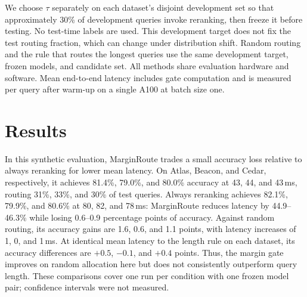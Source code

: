 \documentclass[11pt]{article}
\begin{document}
We choose $\tau$ separately on each dataset's disjoint development set so that approximately 30\% of development queries invoke reranking, then freeze it before testing. No test-time labels are used. This development target does not fix the test routing fraction, which can change under distribution shift. Random routing and the rule that routes the longest queries use the same development target, frozen models, and candidate set. All methods share evaluation hardware and software. Mean end-to-end latency includes gate computation and is measured per query after warm-up on a single A100 at batch size one.

\section{Results}
\label{sec:results}
In this synthetic evaluation, MarginRoute trades a small accuracy loss relative to always reranking for lower mean latency. On Atlas, Beacon, and Cedar, respectively, it achieves 81.4\%, 79.0\%, and 80.0\% accuracy at 43, 44, and 43\,ms, routing 31\%, 33\%, and 30\% of test queries. Always reranking achieves 82.1\%, 79.9\%, and 80.6\% at 80, 82, and 78\,ms: MarginRoute reduces latency by 44.9--46.3\% while losing 0.6--0.9 percentage points of accuracy. Against random routing, its accuracy gains are 1.6, 0.6, and 1.1 points, with latency increases of 1, 0, and 1\,ms. At identical mean latency to the length rule on each dataset, its accuracy differences are $+0.5$, $-0.1$, and $+0.4$ points. Thus, the margin gate improves on random allocation here but does not consistently outperform query length. These comparisons cover one run per condition with one frozen model pair; confidence intervals were not measured.
\end{document}
